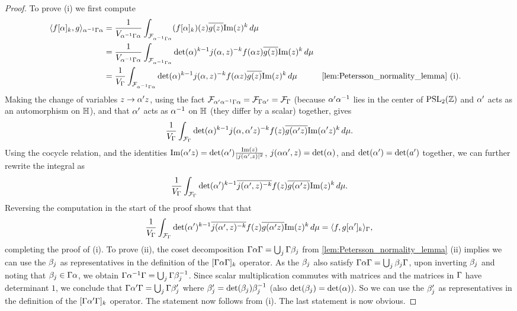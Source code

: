       \begin{proof}
        To prove (i) we first compute
        \begin{align*}
          \<f[\a]_{k},g\>_{\a^{-1}\G\a} &= \frac{1}{V_{\a^{-1}\G\a}}\int_{\mc{F}_{\a^{-1}\G\a}}(f[\a]_{k})(z)\conj{g(z)}\Im(z)^{k}\,d\mu \\
          &= \frac{1}{V_{\a^{-1}\G\a}}\int_{\mc{F}_{\a^{-1}\G\a}}\det(\a)^{k-1}j(\a,z)^{-k}f(\a z)\conj{g(z)}\Im(z)^{k}\,d\mu \\
          &= \frac{1}{V_{\G}}\int_{\mc{F}_{\a^{-1}\G\a}}\det(\a)^{k-1}j(\a,z)^{-k}f(\a z)\conj{g(z)}\Im(z)^{k}\,d\mu && \text{\cref{lem:Petersson_normality_lemma} (i)}.
        \end{align*}
        Making the change of variables $z \to \alpha'z$, using the fact $\mathcal{F}_{\alpha'\alpha^{-1}\Gamma\alpha} = \mathcal{F}_{\Gamma\alpha'} = \mathcal{F}_{\Gamma}$ (because $\alpha'\alpha^{-1}$ lies in the center of $\mathrm{PSL}_{2}(\mathbb{Z})$ and $\alpha'$ acts as an automorphism on $\mathbb{H}$), and that $\alpha'$ acts as $\alpha^{-1}$ on $\mathbb{H}$ (they differ by a scalar) together, gives
        \[
          \frac{1}{V_{\Gamma}}\int_{\mathcal{F}_{\Gamma}}\det(\alpha)^{k-1}j(\alpha,\alpha'z)^{-k}f(z)\overline{g(\alpha'z)}\mathrm{Im}(\alpha'z)^{k}\,d\mu.
        \]
        Using the cocycle relation, and the identities $\mathrm{Im}(\alpha'z) = \det(\alpha')\frac{\mathrm{Im}(z)}{|j(\alpha',z)|^{2}}$, $j(\alpha\alpha',z) = \det(\alpha)$, and $\det(\alpha') = \det(a')$ together, we can further rewrite the integral as
        \[
          \frac{1}{V_{\Gamma}}\int_{\mathcal{F}_{\Gamma}}\det(\alpha')^{k-1}\overline{j(\alpha',z)^{-k}}f(z)\overline{g(\alpha'z)}\mathrm{Im}(z)^{k}\,d\mu.
        \]
        Reversing the computation in the start of the proof shows that that
        \[
          \frac{1}{V_{\Gamma}}\int_{\mathcal{F}_{\Gamma}}\det(\alpha')^{k-1}\overline{j(\alpha',z)^{-k}}f(z)\overline{g(\alpha'z)}\mathrm{Im}(z)^{k}\,d\mu = \langle f,g[\alpha']_{k}\rangle_{\Gamma},
        \]
        completing the proof of (i). To prove (ii), the coset decomposition $\Gamma\alpha\Gamma = \bigcup_{j}\Gamma\beta_{j}$ from \cref{lem:Petersson_normality_lemma} (ii) implies we can use the $\beta_{j}$ as representatives in the definition of the $[\Gamma\alpha\Gamma]_{k}$ operator. As the $\beta_{j}$ also satisfy $\Gamma\alpha\Gamma = \bigcup_{j}\beta_{j}\Gamma$, upon inverting $\beta_{j}$ and noting that $\beta_{j} \in \Gamma\alpha$, we obtain $\Gamma\alpha^{-1}\Gamma = \bigcup_{j}\Gamma\beta_{j}^{-1}$. Since scalar multiplication commutes with matrices and the matrices in $\Gamma$ have determinant $1$, we conclude that $\Gamma\alpha'\Gamma = \bigcup_{j}\Gamma\beta_{j}'$ where $\beta_{j}' = \det(\beta_{j})\beta_{j}^{-1}$ (also $\det(\beta_{j}) = \det(\alpha)$). So we can use the $\beta_{j}'$ as representatives in the definition of the $[\Gamma\alpha'\Gamma]_{k}$ operator. The statement now follows from (i). The last statement is now obvious.
      \end{proof}

